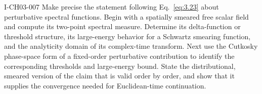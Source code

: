 \begin{exercise}{I-CH03-007}
Make precise the statement following Eq.~\eqref{eq:3.23} about perturbative
spectral functions.  Begin with a spatially smeared free scalar field and
compute its two-point spectral measure.  Determine its delta-function or
threshold structure, its large-energy behavior for a Schwartz smearing
function, and the analyticity domain of its complex-time transform.  Next use
the Cutkosky phase-space form of a fixed-order perturbative contribution to
identify the corresponding thresholds and large-energy bound.  State the
distributional, smeared version of the claim that is valid order by order, and
show that it supplies the convergence needed for Euclidean-time continuation.
\end{exercise}
